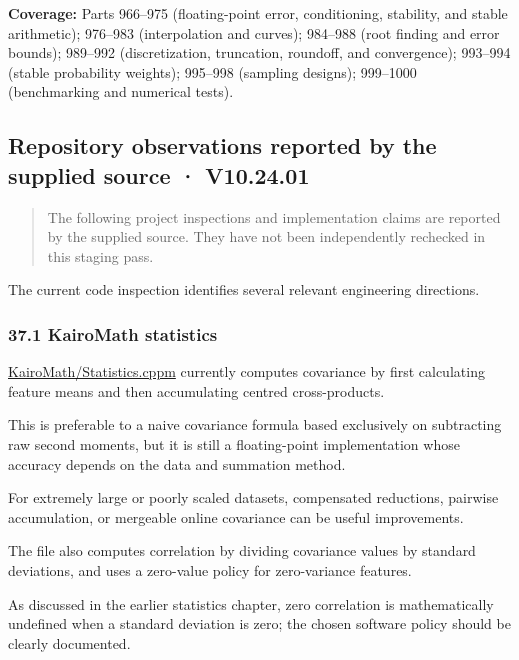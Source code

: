 \textbf{Coverage:} Parts 966--975 (floating-point error, conditioning, stability, and stable arithmetic); 976--983 (interpolation and curves); 984--988 (root finding and error bounds); 989--992 (discretization, truncation, roundoff, and convergence); 993--994 (stable probability weights); 995--998 (sampling designs); 999--1000 (benchmarking and numerical tests).

\subsection{Repository observations reported by the supplied source · V10.24.01}\label{02-foundations-ii-ch039-repository-observations-reported-by-the-supplied-source-v10.24.01}

\begin{quote}
The following project inspections and implementation claims are reported by the supplied source. They have not been independently rechecked in this staging pass.
\end{quote}

The current code inspection identifies several relevant engineering directions.

\subsubsection{37.1 KairoMath statistics}\label{02-foundations-ii-ch039-kairomath-statistics-1}

\href{https://github.com/swayam8624/KairoMath/blob/master/Statistics.cppm?utm_source=chatgpt.com}{KairoMath/Statistics.cppm} currently computes covariance by first calculating feature means and then accumulating centred cross-products.

This is preferable to a naive covariance formula based exclusively on subtracting raw second moments, but it is still a floating-point implementation whose accuracy depends on the data and summation method.

For extremely large or poorly scaled datasets, compensated reductions, pairwise accumulation, or mergeable online covariance can be useful improvements.

The file also computes correlation by dividing covariance values by standard deviations, and uses a zero-value policy for zero-variance features.

As discussed in the earlier statistics chapter, zero correlation is mathematically undefined when a standard deviation is zero; the chosen software policy should be clearly documented.

